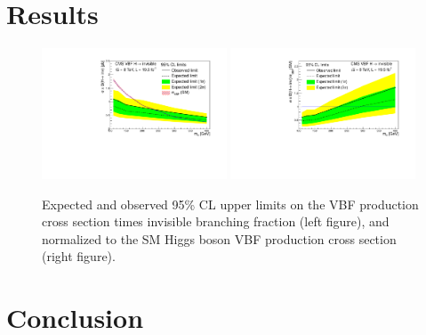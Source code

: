 \section{Results}


\begin{figure}[htp]
\centering
\includegraphics[width=0.49\textwidth]{Chapter05/Images/vbfxslimit.pdf}
\includegraphics[width=0.49\textwidth]{Chapter05/Images/vbflimit.pdf}
\caption{Expected and observed 95\% CL upper limits on the VBF production cross section times invisible branching fraction (left figure), and normalized to the SM Higgs boson VBF production cross section (right figure). \cite{ARTICLE:CMSVBFHiggsToInvAndZHCombination}}
\label{FIGURE:vbfLimit}
\end{figure}


\section{Conclusion}



% 


